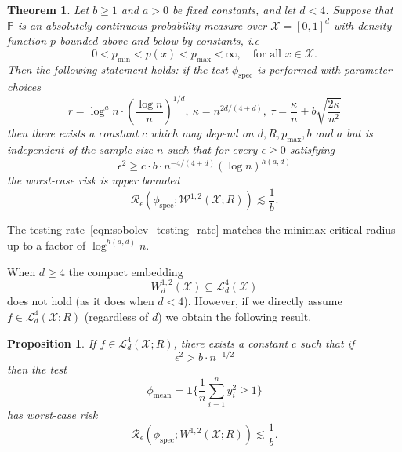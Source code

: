 \documentclass{article}
\newcommand{\1}{\mathbf{1}}
\newcommand{\Pbb}{\mathbb{P}}
\newcommand{\spec}{\mathrm{spec}}
\theoremstyle{alden}
\theoremstyle{aldenthm}
\newtheorem{theorem}{Theorem}
\newtheorem{proposition}{Proposition}
\theoremstyle{definition}
\theoremstyle{remark}
\begin{document}
\begin{theorem}
	\label{thm:sobolev_testing_rate}
	Let $b \geq 1$ and $a > 0$ be fixed constants, and let $d < 4$. Suppose that $\Pbb$ is an absolutely continuous probability measure over $\mathcal{X} = [0,1]^d$ with density function $p$ bounded above and below by constants, i.e
	\begin{equation*}
	0 < p_{\min} < p(x) < p_{\max} < \infty, \quad \textrm{for all $x \in \mathcal{X}$.}
	\end{equation*}
	Then the following statement holds: if the test $\phi_{\spec}$ is performed with parameter choices 
	\begin{equation*}
	r = \log^a n \cdot \left(\frac{\log n}{n}\right)^{1/d}, ~\kappa = n^{2d/(4 + d)}, ~\tau = \frac{\kappa}{n} + b\sqrt{\frac{2\kappa}{n^2}}
	\end{equation*}
	then there exists a constant $c$ which may depend on $d,R,p_{\max},b$ and $a$ but is independent of the sample size $n$ such that for every $\epsilon \geq 0$ satisfying
	\begin{equation}
	\label{eqn:sobolev_testing_rate}
	\epsilon^2 \geq c \cdot b \cdot n^{-4/(4 + d)} (\log n)^{h(a,d)}
	\end{equation}
	the worst-case risk is upper bounded
	\begin{equation}
	\label{eqn:sobolev_testing_rate_1}
	\mathcal{R}_{\epsilon}(\phi_{\mathrm{spec}}; \mathcal{W}^{1,2}(\mathcal{X};R)) \lesssim \frac{1}{b}.
	\end{equation}
\end{theorem}
The testing rate~\eqref{eqn:sobolev_testing_rate} matches the minimax critical radius up to a factor of $\log^{h(a,d)}n$.

When $d \geq 4$ the compact embedding
\begin{equation*}
W_d^{1,2}(\mathcal{X}) \subseteq \mathcal{L}_d^4(\mathcal{X}) 
\end{equation*}
does not hold (as it does when $d < 4$). However, if we directly assume $f \in \mathcal{L}_d^4(\mathcal{X};R)$ (regardless of $d$) we obtain the following result.
\begin{proposition}
	\label{prop:L4_testing_rate}
	If $f \in \mathcal{L}_d^4(\mathcal{X};R)$, there exists a constant $c$ such that if
	\begin{equation}
	\label{eqn:L4_testing_rate}
	\epsilon^2 > b \cdot n^{-1/2}
	\end{equation}
	then the test
	\begin{equation*}
	\phi_{\mathrm{mean}} = \1\{\frac{1}{n}\sum_{i = 1}^{n} y_i^2 \geq 1\}
	\end{equation*}
	has worst-case risk
	\begin{equation*}
	\mathcal{R}_{\epsilon}(\phi_{\mathrm{spec}}; W^{1,2}(\mathcal{X};R)) \lesssim \frac{1}{b}. 
	\end{equation*}
\end{proposition}
\end{document}
